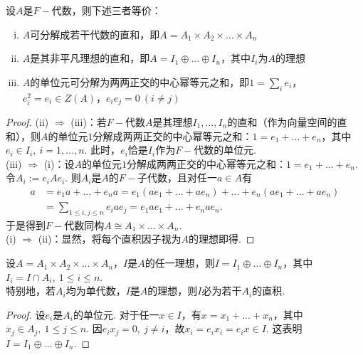 \begin{proposition}
    设$A$是$F-\!\!$代数，则下述三者等价：
    \begin{enumerate}[(i)]
        \item $A$可分解成若干代数的直和，即$A = A_1 \times A_2 \times \dots \times A_n$
        \item $A$是其非平凡理想的直和，即$A = I_1 \oplus \dots \oplus I_n$，其中$I_i$为$A$的理想
        \item $A$的单位元可分解为两两正交的中心幂等元之和，即$1 = \sum\limits_i e_i$，$e_i^2 = e_i \in Z(A)$，$e_i e_j = 0\ (i \neq j)$
    \end{enumerate}
\end{proposition}

\begin{proof}
    (ii) $\Rightarrow$ (iii)：若$F-\!\!$代数$A$是其理想$I_1, \dots, I_n$的直和（作为向量空间的直和），则$A$的单位元$1$分解成两两正交的中心幂等元之和：$1 = e_1 + \dots + e_n$，其中$e_i \in I_i,\ i = 1, \dots, n$. 此时，$e_i$恰是$I_i$作为$F-\!\!$代数的单位元. \\
    (iii) $\Rightarrow$ (i)：设$A$的单位元$1$分解成两两正交的中心幂等元之和：$1 = e_1 + \dots + e_n$. 令$A_i := e_i A e_i$. 则$A_i$是$A$的$F-\!\!$子代数，且对任一$a \in A$有
    \begin{align*}
        a &= e_1 a + \dots + e_n a = e_1 (ae_1 + \dots + a e_n) + \dots + e_n(ae_1 + \dots + ae_n) \\
          &= \sum_{1 \le i, j \le n} e_i a e_j = e_1 a e_1 + \dots + e_n a e_n.
    \end{align*}
    于是得到$F-\!\!$代数同构$A \cong A_1 \times \dots \times A_n$. \\
    (i) $\Rightarrow$ (ii)：显然，将每个直积因子视为$A$的理想即得.
\end{proof}

\begin{proposition}[]
    设$A = A_1 \times A_2 \times \dots \times A_n$，$I$是$A$的任一理想，则$I = I_1 \oplus \dots \oplus I_n$，其中$I_i = I \cap A_i,\ 1 \le i \le n$. \\
    特别地，若$A_i$均为单代数，$I$是$A$的理想，则$I$必为若干$A_i$的直积.
\end{proposition}

\begin{proof}
    设$e_i$是$A_i$的单位元. 对于任一$x \in I$，有$x = x_1 + \dots + x_n$，其中$x_j \in A_j,\ 1 \le j \le n$. 
    因$e_i x_j = 0,\ j \neq i$，故$x_i = e_i x_i = e_i x \in I$. 
    这表明$I = I_1 \oplus \dots \oplus I_n$.
\end{proof}

